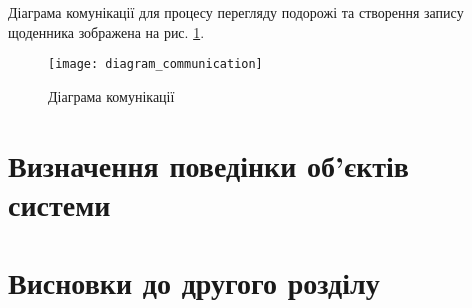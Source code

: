 \documentclass[../main.tex]{subfiles}
\begin{document}
Діаграма комунікації для процесу перегляду подорожі та створення запису щоденника зображена на рис. \ref{diagram:2.4}.

\begin{figure}[H]
	\centering
	\texttt{[image: diagram\_communication]}
	\caption{Діаграма комунікації}
	\label{diagram:2.4}
\end{figure}


\section{Визначення поведінки об'єктів системи}


\section{Висновки до другого розділу}

\end{document}
